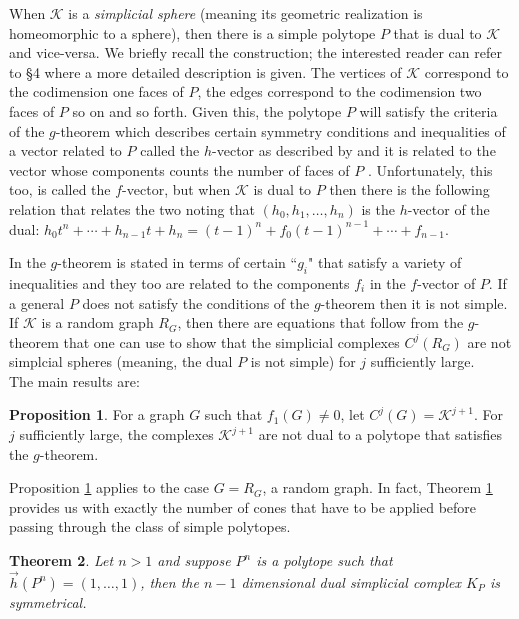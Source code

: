 \documentclass[oneside,12pt]{amsart}
\newtheorem{Theorem}{Theorem}[section]
\theoremstyle{definition}
\newtheorem{Proposition}[Theorem]{Proposition}
\numberwithin{equation}{section}
\begin{document}
When $\mathcal{K}$ is a \textit{simplicial sphere} (meaning its geometric realization is homeomorphic to a sphere), then there is a simple polytope $P$ that is dual to $\mathcal{K}$ and vice-versa.  We briefly recall the construction; the interested reader can refer to \S4 where a more detailed description is given.  The vertices of $\mathcal{K}$ correspond to the codimension one faces of $P$, the edges correspond to the codimension two faces of $P$ so on and so forth. Given this, the polytope $P$ will satisfy the criteria of the $g$-theorem which describes certain symmetry conditions and inequalities of a vector related to $P$ called the $h$-vector as described by \cite{BP1} and it is related to the vector whose components counts the number of faces of $P$ \cite{BP1}.  Unfortunately, this too, is called the $f$-vector, but when $\mathcal{K}$ is dual to $P$ then there is the following relation that relates the two noting that $(h_0, h_1,\ldots,h_n)$ is the $h$-vector of the dual:  $h_0t^n + \cdots+ h_{n-1}t + h_n  = (t-1)^n + f_0(t-1)^{n-1} + \cdots + f_{n-1}$. 

In \cite{B} the $g$-theorem is stated in terms of certain ``$g_i$" that satisfy a variety of inequalities and they too are related to the components $f_i$ in the $f$-vector of $P$.  If a general $P$ does not satisfy the conditions of the $g$-theorem then it is not simple.  If $\mathcal{K}$ is a random graph $R_G$, then there are equations that follow from the $g$-theorem that one can use to show that the simplicial complexes $C^j(R_G)$ are not simplcial spheres (meaning, the dual $P$ is not simple) for $j$ sufficiently large.\\[.5ex]

The main results are:

\begin{Proposition}\label{No g Theorem}
For a graph $G$ such that $f_1(G) \neq 0$, let $C^{j}(G) = \mathcal{K}^{j+1}$. For $j$ sufficiently large, the complexes $\mathcal{K}^{j+1}$ are not dual to a polytope that satisfies the $g$-theorem.
\end{Proposition}

Proposition \ref{No g Theorem} applies to the case $G = R_G$, a random graph.  In fact, Theorem \ref{No g Theorem} provides us with exactly the number of cones that have to be applied before passing through the class of simple polytopes.
\begin{Theorem} \label{N simplex}
Let $n >1$ and suppose $P^n$ is a polytope such that $\overrightarrow{h}(P^n) = (1,\ldots,1)$, then the $n-1$ dimensional dual simplicial complex $K_P$ is symmetrical.  %
\end{Theorem}
\end{document}
